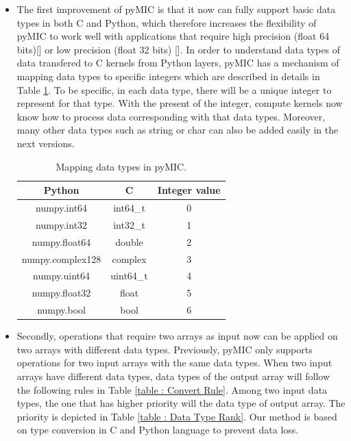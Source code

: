 \begin{itemize}
\item The first improvement of pyMIC is that it now can fully support basic data types in both C and Python, which therefore increases the flexibility of pyMIC to work well with applications that require high precision (float 64 bits)[] or low precision (float 32 bits) []. In order to understand data types of data transfered to C kernels from Python layers, pyMIC has a mechanism of mapping data types to specific integers which are described in details in Table \ref{table : data type mapping}. To be specific, in each data type, there will be a unique integer to represent for that type. With the present of the integer, compute kernels now know how to process data corresponding with that data types. Moreover, many other data types such as string or char can also be added easily in the next versions.

\begin{table}
\centering
\caption{Mapping data types in pyMIC.}
\label{table : data type mapping}
\begin{tabular}{ |c|c|c|  }
\hline
\textbf{Python} & \textbf{C} & \textbf{Integer value} \\ \hline
numpy.int64 & int64\_t &0 \\
numpy.int32 & int32\_t &1 \\
numpy.float64 & double &2 \\
numpy.complex128 &complex &3 \\
numpy.uint64 & uint64\_t & 4\\
numpy.float32 & float & 5\\
numpy.bool & bool & 6\\
\hline
\end{tabular}

\end{table}

\item Secondly, operations that require two arrays as input now can be applied on two arrays with different data types. Previously, pyMIC only supports operations for two input arrays with the same data types. When two input arrays have different data types, data types of the output array will follow the following rules in Table \ref{table : Convert Rule}. Among two input data types, the one that has higher priority will the data type of output array. The priority is depicted in Table \ref{table : Data Type Rank}. Our method is based on type conversion in C and Python language to prevent data loss.


\end{itemize}

